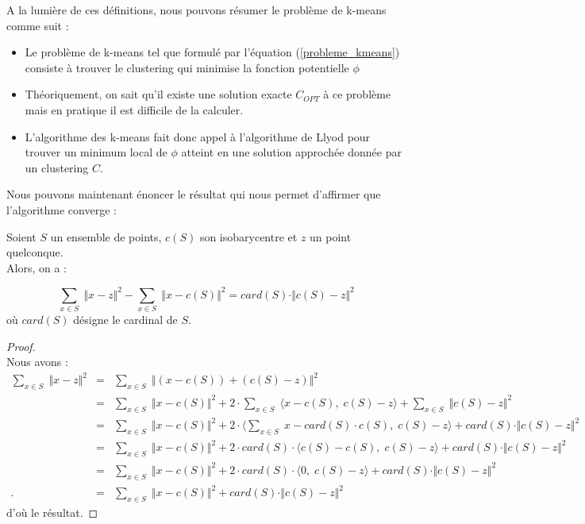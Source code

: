 \documentclass[12pt,a4paper]{book}
\newcommand{\1}{\mathds{1}}
\begin{document}
	A la lumière de ces définitions, nous pouvons résumer le problème de k-means comme suit :
	\begin{itemize}
		\item Le problème de k-means tel que formulé par l'équation (\ref{probleme_kmeans}) consiste à trouver le clustering qui minimise la fonction potentielle $\phi$
		\item Théoriquement, on sait qu'il existe une solution exacte $C_{OPT}$ à ce problème mais en pratique il est difficile de la calculer.
		\item L'algorithme des k-means fait donc appel à l'algorithme de Llyod pour trouver un minimum local de $\phi$ atteint en une solution approchée donnée par un clustering $C$. \\
	\end{itemize}

Nous pouvons maintenant énoncer le résultat qui nous permet d'affirmer que l'algorithme converge :

	\begin{env_lemme}\label{lemme2.1}
		Soient $S$ un ensemble de points, $c(S)$ son isobarycentre et $z$ un point quelconque.\\
		Alors, on a :
		
		$$
			\sum_{x \in S} \; \Vert x-z \Vert^2 - \sum_{x \in S} \; \Vert x-c(S) \Vert^2 = card(S) \cdot \Vert c(S)-z \Vert^2
		$$
		où $card(S)$ désigne le cardinal de $S$.
	\end{env_lemme}	
	
	\begin{proof}
		~\\
		Nous avons :
		\begin{eqnarray*}
			\sum_{x \in S} \; \Vert x-z \Vert^2 &=& \sum_{x \in S} \; \Vert \left( x - c(S) \right) + \left( c(S)- z \right) \Vert^2 \\
			& = & \sum_{x \in S} \; \Vert x - c(S) \Vert^2 + 2 \cdot \sum_{x \in S} \; \langle x - c(S), \; c(S)- z \rangle + \sum_{x \in S} \; \Vert c(S)- z \Vert^2 \\
			& = & \sum_{x \in S} \; \Vert x - c(S) \Vert^2 + 2 \cdot \langle \sum_{x \in S} \; x - card(S) \cdot c(S), \; c(S)- z \rangle + card(S) \cdot \Vert c(S)- z \Vert^2 \\
			& = & \sum_{x \in S} \; \Vert x - c(S) \Vert^2 + 2 \cdot card(S) \cdot \langle c(S) - c(S), \; c(S)- z \rangle + card(S) \cdot \Vert c(S)- z \Vert^2 \\
			& = & \sum_{x \in S} \; \Vert x - c(S) \Vert^2 + 2 \cdot card(S) \cdot \langle 0, \; c(S)- z \rangle + card(S) \cdot\Vert c(S)- z \Vert^2 \\.
			& = & \sum_{x \in S} \; \Vert x - c(S) \Vert^2 + card(S) \cdot \Vert c(S)- z \Vert^2
		\end{eqnarray*}
		d'où le résultat.
	\end{proof}
\end{document}

